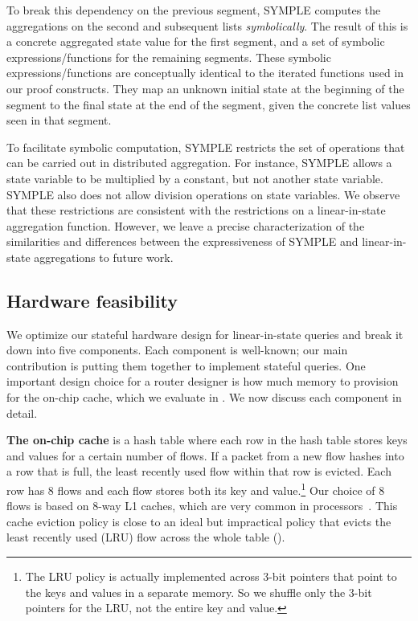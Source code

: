To break this dependency on the previous segment, SYMPLE computes the
aggregations on the second and subsequent lists {\em symbolically}.  The result
of this is a concrete aggregated state value for the first segment, and a set
of symbolic expressions/functions for the remaining segments.  These symbolic
expressions/functions are conceptually identical to the iterated functions used
in our proof constructs.  They map an unknown initial state at the beginning of
the segment to the final state at the end of the segment, given the concrete
list values seen in that segment.

To facilitate symbolic computation, SYMPLE restricts the set of operations that
can be carried out in distributed aggregation. For instance, SYMPLE allows a
state variable to be multiplied by a constant, but not another state variable.
SYMPLE also does not allow division operations on state variables. We observe
that these restrictions are consistent with the restrictions on a
linear-in-state aggregation function. However, we leave a precise
characterization of the similarities and differences between the expressiveness
of SYMPLE and linear-in-state aggregations to future work.

\subsection{Hardware feasibility}
\label{sec:hardware-feasibility}
We optimize our stateful hardware design for linear-in-state queries and break
it down into five components.  Each component is well-known; our main
contribution is putting them together to implement stateful queries.
One important design choice for a router designer is how much memory to
provision for the on-chip cache, which we evaluate in .
We now discuss each component in detail.

\textbf{The on-chip cache} is a hash table where each row in the hash table
stores keys and values for a certain number of flows. If a packet from a new
flow hashes into a row that is full, the least recently used flow within that
row is evicted. Each row has 8 flows and each flow stores both its key and
value.\footnote{The LRU policy is actually implemented across 3-bit pointers
that point to the keys and values in a separate memory. So we shuffle only the
3-bit pointers for the LRU, not the entire key and value.} Our choice of 8
flows is based on 8-way L1 caches, which are very common in
processors~\cite{intel_opt_manual}. This cache eviction policy is close to an
ideal but impractical policy that evicts the least recently used (LRU) flow
across the whole table ().

